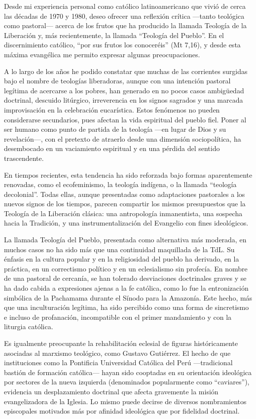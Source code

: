 \documentclass[12pt]{article}
\begin{document}
Desde mi experiencia personal como católico latinoamericano que vivió de cerca las décadas de 1970 y 1980, deseo ofrecer una reflexión crítica —tanto teológica como pastoral— acerca de los frutos que ha producido la llamada Teología de la Liberación y, más recientemente, la llamada “Teología del Pueblo”. En el discernimiento católico, “por sus frutos los conoceréis” (Mt 7,16), y desde esta máxima evangélica me permito expresar algunas preocupaciones.

A lo largo de los años he podido constatar que muchas de las corrientes surgidas bajo el nombre de teologías liberadoras, aunque con una intención pastoral legítima de acercarse a los pobres, han generado en no pocos casos ambigüedad doctrinal, descuido litúrgico, irreverencia en los signos sagrados y una marcada improvisación en la celebración eucarística. Estos fenómenos no pueden considerarse secundarios, pues afectan la vida espiritual del pueblo fiel. Poner al ser humano como punto de partida de la teología —en lugar de Dios y su revelación—, con el pretexto de atraerlo desde una dimensión sociopolítica, ha desembocado en un vaciamiento espiritual y en una pérdida del sentido trascendente.

En tiempos recientes, esta tendencia ha sido reforzada bajo formas aparentemente renovadas, como el ecofeminismo, la teología indígena, o la llamada “teología decolonial”. Todas ellas, aunque presentadas como adaptaciones pastorales a los nuevos signos de los tiempos, parecen compartir los mismos presupuestos que la Teología de la Liberación clásica: una antropología inmanentista, una sospecha hacia la Tradición, y una instrumentalización del Evangelio con fines ideológicos.

La llamada Teología del Pueblo, presentada como alternativa más moderada, en muchos casos no ha sido más que una continuidad maquillada de la TdL. Su énfasis en la cultura popular y en la religiosidad del pueblo ha derivado, en la práctica, en un correctismo político y en un eclesialismo sin profecía. En nombre de una pastoral de cercanía, se han tolerado desviaciones doctrinales graves y se ha dado cabida a expresiones ajenas a la fe católica, como lo fue la entronización simbólica de la Pachamama durante el Sínodo para la Amazonía. Este hecho, más que una inculturación legítima, ha sido percibido como una forma de sincretismo e incluso de profanación, incompatible con el primer mandamiento y con la liturgia católica.

Es igualmente preocupante la rehabilitación eclesial de figuras históricamente asociadas al marxismo teológico, como Gustavo Gutiérrez. El hecho de que instituciones como la Pontificia Universidad Católica del Perú —tradicional bastión de formación católica— hayan sido cooptadas en su orientación ideológica por sectores de la nueva izquierda (denominados popularmente como “caviares”), evidencia un desplazamiento doctrinal que afecta gravemente la misión evangelizadora de la Iglesia. Lo mismo puede decirse de diversos nombramientos episcopales motivados más por afinidad ideológica que por fidelidad doctrinal.
\end{document}
